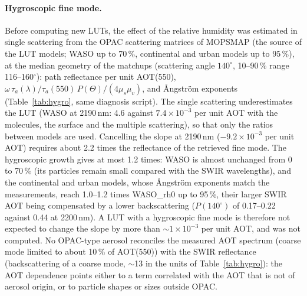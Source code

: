 \documentclass[11pt,a4paper]{article}
\begin{document}
\paragraph{Hygroscopic fine mode.} Before computing new LUTs, the effect of the relative humidity was estimated in
single scattering from the OPAC scattering matrices of MOPSMAP (the source of the LUT models; WASO up to 70\,\%,
continental and urban models up to 95\,\%), at the median geometry of the matchups (scattering angle $140^\circ$,
10--90\,\% range 116--160$^\circ$): path reflectance per unit AOT(550),
$\omega\,\tau_a(\lambda)/\tau_a(550)\,P(\Theta)/(4\mu_s\mu_v)$, and Ångström exponents (Table~\ref{tab:hygro}, same diagnosis
script). The single scattering underestimates the LUT (WASO at 2190\,nm: 4.6 against
$7.4\times10^{-3}$ per unit AOT with the molecules, the surface and the multiple scattering), so that only the ratios
between models are used. Cancelling the slope at 2190\,nm ($-9.2\times10^{-3}$ per unit AOT) requires about 2.2 times
the reflectance of the retrieved fine mode. The hygroscopic growth gives at most 1.2 times: WASO is almost unchanged
from 0 to 70\,\% (its particles remain small compared with the SWIR wavelengths), and the continental and urban models,
whose Ångström exponents match the measurements, reach 1.0--1.2 times WASO\_rh0 up to 95\,\%, their larger SWIR AOT
being compensated by a lower backscattering ($P(140^\circ)$ of 0.17--0.22 against 0.44 at 2200\,nm). A LUT with a
hygroscopic fine mode is therefore not expected to change the slope by more than $\sim1\times10^{-3}$ per unit AOT,
and was not computed. No OPAC-type aerosol reconciles the measured AOT spectrum (coarse mode limited to about 10\,\% of
AOT(550)) with the SWIR reflectance (backscattering of a coarse mode, $\sim$13 in the units of
Table~\ref{tab:hygro}): the AOT dependence points either to a term correlated with the AOT that is not of aerosol
origin, or to particle shapes or sizes outside OPAC.
\end{document}
